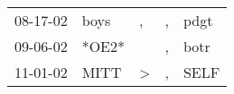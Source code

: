 \begin{supertabular}{p{0.07\textwidth}p{0.06\textwidth}p{0.02\textwidth}p{0.02\textwidth}p{0.06\textwidth}}
 08-17-02\textsuperscript{} &  boys\textsuperscript{} &             , &  , &  pdgt\textsuperscript{} \\
 09-06-02\textsuperscript{} &                   *OE2* &               &  , &  botr\textsuperscript{} \\
 11-01-02\textsuperscript{} &  MITT\textsuperscript{} &  \textgreater &  , &  SELF\textsuperscript{} \\
\end{supertabular}
